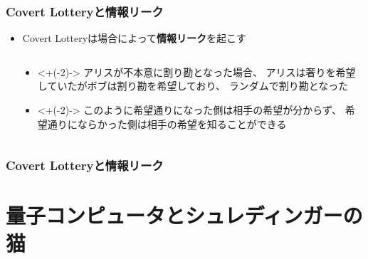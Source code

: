 \begin{frame}
  \frametitle{Covert Lotteryと情報リーク}

  \begin{itemize}
    \item Covert Lotteryは場合によって\textbf{情報リーク}を起こす
  \end{itemize}

  \pause
  \begin{columns}
    \begin{column}{0.6\textwidth}

    \end{column}
    \begin{column}{0.4\textwidth}
      \begin{itemize}
        \item<+(-2)-> アリスが不本意に割り勘となった場合、
        アリスは奢りを希望していたがボブは割り勘を希望しており、
        ランダムで割り勘となった

        \item<+(-2)-> このように希望通りになった側は相手の希望が分からず、
        希望通りにならかった側は相手の希望を知ることができる
      \end{itemize}
    \end{column}
  \end{columns}
\end{frame}

\begin{frame}
  \frametitle{Covert Lotteryと情報リーク}


  \pause
\end{frame}

\section{量子コンピュータとシュレディンガーの猫}

